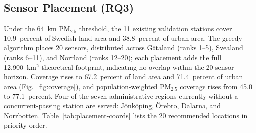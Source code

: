 \documentclass[conference]{IEEEtran}
\begin{document}
\subsection{Sensor Placement (RQ3)}
\label{sec:results-rq3}

Under the 64~km PM$_{2.5}$ threshold, the 11 existing validation stations
cover 10.9~percent of Swedish land area and 38.8~percent of urban area. The
greedy algorithm places 20 sensors, distributed across G\"otaland (ranks
1--5), Svealand (ranks 6--11), and Norrland (ranks 12--20); each placement
adds the full 12{,}900~km$^{2}$ theoretical footprint, indicating no overlap
within the 20-sensor horizon. Coverage rises to 67.2~percent of land area and
71.4~percent of urban area (Fig.~\ref{fig:coverage}), and population-weighted
PM$_{2.5}$ coverage rises
from 45.0 to 77.1~percent. Four of the seven administrative regions currently
without a concurrent-passing station are served: J\"onk\"oping, \"Orebro,
Dalarna, and Norrbotten. Table~\ref{tab:placement-coords} lists the 20
recommended locations in priority order.
\end{document}
